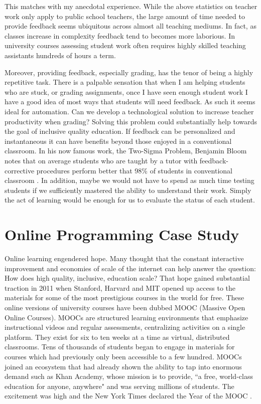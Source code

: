 This matches with my anecdotal experience. While the above statistics on teacher work only apply to public school teachers, the large amount of time needed to provide feedback seems ubiquitous across almost all teaching mediums. In fact, as classes increase in complexity feedback tend to becomes more laborious. In university courses assessing student work often requires highly skilled teaching assistants hundreds of hours a term.

Moreover, providing feedback, especially grading, has the tenor of being a highly repetitive task. There is a palpable sensation that when I am helping students who are stuck, or grading assignments, once I have seen enough student work I have a good idea of most ways that students will need feedback. As such it seems ideal for automation. Can we develop a technological solution to increase teacher productivity when grading? Solving this problem could substantially help towards the goal of inclusive quality education. If feedback can be personalized and instantaneous it can have benefits beyond those enjoyed in a conventional classroom. In his now famous work, the Two-Sigma Problem, Benjamin Bloom notes that on average students who are taught by a tutor with feedback-corrective procedures perform better that 98\% of students in conventional classroom \cite{corbett2001cognitive}. In addition, maybe we would not have to spend as much time testing students if we sufficiently mastered the ability to understand their work. Simply the act of learning would be enough for us to evaluate the status of each student.  

\section{Online Programming Case Study}

Online learning engendered hope. Many thought that the constant interactive improvement and economies of scale of the internet can help answer the question: How does high quality, inclusive, education scale? 
That hope gained substantial traction in 2011 when Stanford, Harvard and MIT opened up access to the materials for some of the most prestigious courses in the world for free. These online versions of university courses have been dubbed MOOC (Massive Open Online Courses). MOOCs are
structured learning environments that emphasize instructional
videos and regular assessments, centralizing activities
on a single platform. They exist for six to ten weeks at a time as virtual, distributed classrooms. Tens of thousands of students began to engage in materials for courses which had previously only been accessible to a few hundred. MOOCs joined an ecosystem that had already shown the ability to tap into enormous demand such as Khan Academy, whose mission is to provide, ``a free, world-class education for anyone, anywhere" and was serving millions of students. The excitement was high and the New York Times declared the Year of the MOOC \cite{pappano2012year}. 

